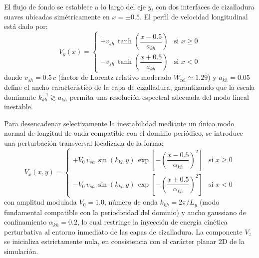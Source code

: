 El flujo de fondo se establece a lo largo del eje $y$, con dos interfaces de cizalladura suaves ubicadas simétricamente en $x = \pm 0.5$. El perfil de velocidad longitudinal está dado por:
\begin{equation}
    V_y(x) = \begin{cases} 
      +v_{sh}\, \tanh\!\left(\dfrac{x - 0.5}{a_{kh}}\right) & \text{si } x \geq 0 \\[4pt]
      -v_{sh}\, \tanh\!\left(\dfrac{x + 0.5}{a_{kh}}\right) & \text{si } x < 0 
   \end{cases}
   \label{eq:Vy_profile}
\end{equation}
donde $v_{sh} = 0.5\, c$ (factor de Lorentz relativo moderado $W_{\text{rel}} \simeq 1.29$) y $a_{kh} = 0.05$ define el ancho característico de la capa de cizalladura, garantizando que la escala dominante $k_{kh}^{-1}\!\gtrsim\!a_{kh}$ permita una resolución espectral adecuada del modo lineal inestable.

Para desencadenar selectivamente la inestabilidad mediante un único modo normal de longitud de onda compatible con el dominio periódico, se introduce una perturbación transversal localizada de la forma:
\begin{equation}
    V_x(x,y) = \begin{cases} 
      +V_0\, v_{sh}\, \sin(k_{kh}\, y)\, \exp\!\left[-\!\left(\dfrac{x - 0.5}{\alpha_{kh}}\right)^{\!2}\right] & \text{si } x \geq 0 \\[6pt]
      -V_0\, v_{sh}\, \sin(k_{kh}\, y)\, \exp\!\left[-\!\left(\dfrac{x + 0.5}{\alpha_{kh}}\right)^{\!2}\right] & \text{si } x < 0 
   \end{cases}
   \label{eq:Vx_pert}
\end{equation}
con amplitud modulada $V_0 = 1.0$, número de onda $k_{kh} = 2\pi/L_y$ (modo fundamental compatible con la periodicidad del dominio) y ancho gaussiano de confinamiento $\alpha_{kh} = 0.2$, lo cual restringe la inyección de energía cinética perturbativa al entorno inmediato de las capas de cizalladura. La componente $V_z$ se inicializa estrictamente nula, en consistencia con el carácter planar 2D de la simulación.

